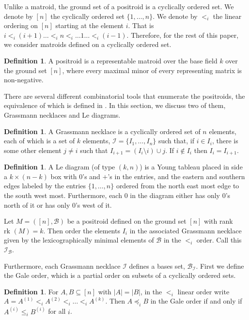\documentclass[11pt]{article}
\newcommand{\rk}{\textrm{rk }}
\newcommand{\cI}{\mathcal{I}}
\newcommand{\sB}{\mathscr{B}}
\theoremstyle{remark}
\theoremstyle{definition}
\newtheorem{dfn}[thm]{Definition}
\begin{document}
Unlike a matroid, the ground set of a positroid is a cyclically ordered set. We denote by $[n]$ the cyclically ordered set $\{1, \ldots, n\}$. We denote by $<_i$ the linear ordering on $[n]$ starting at the element $i$. That is $i <_i (i+1) \ldots <_i n <_i \ldots 1 \ldots <_i (i-1)$. Therefore, for the rest of this paper, we consider matroids defined on a cyclically ordered set. 
 
\begin{dfn}\label{dfn:positroid}
A positroid is a representable matroid over the base field $k$ over the ground set $[n]$, where every maximal minor of every representing matrix is non-negative. 
\end{dfn}

There are several different combinatorial tools that enumerate the positroids, the equivalence of which is defined in \cite{Postnikov}. In this section, we discuss two of them, Grassmann necklaces and Le diagrams.

\begin{dfn} \label{dfn:GN} A Grassmann necklace is a cyclically ordered set of $n$ elements, each of which is a set of $k$ elements, $\cI = \{I_1, \ldots , I_n\}$ such that, if $i\in I_i$, there is some other element $j \neq i$ such that $I_{i+1} = \left(I_i \setminus i\right) \cup j$. If $i \not \in I_i$ then $I_i = I_{i+1}$.
\end{dfn}

\begin{dfn} \label{dfn:Le}
    A Le diagram (of type $(k, n)$) is a Young tableau placed in side a $k \times (n-k)$ box with $0$'s and $+$'s in the entries, and the eastern and southern edges labeled by the entries $\{1, \ldots, n\}$ ordered from the north east most edge to the south west most. Furthermore, each $0$ in the diagram either has only $0$'s north of it or has only $0$'s west of it.
\end{dfn}

Let $M = ([n], \sB)$ be a positroid defined on the ground set $[n]$ with rank $\rk(M) = k$. Then order the elements $I_i$ in the associated Grassmann necklace given by the lexicographically minimal elements of $\sB$ in the $<_i$ order. Call this $\cI_\sB$.

Furthermore, each Grassmann necklace $\cI$ defines a bases set, $\sB_\cI$. First we define the Gale order, which is a partial order on subsets of a cyclically ordered sets. 

\begin{dfn} \label{dfn:Gale} For $A, B \subseteq [n]$ with $|A| = |B|$, in the $<_i$ linear order write $A = A^{(1)} <_i A^{(2)} <_i \ldots <_i A^{(k)}$. Then $A \preceq_i B$ in the Gale order  if and only if $A^{(i)} \leq_i B^{(i)}$ for all $i$. \end{dfn}
\end{document}

